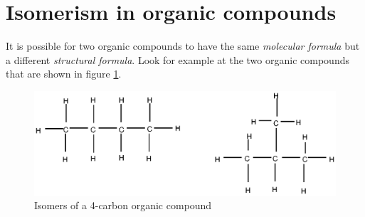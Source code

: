 



\section{Isomerism in organic compounds}
\label{sec:organic:isomer}

It is possible for two organic compounds to have the same \textit{molecular formula} but a different \textit{structural formula}. Look for example at the two organic compounds that are shown in figure \ref{fig:organic:butane}.

\begin{figure}[h]
\begin{center}
 \includegraphics{../../epsimages/isomer_butane.eps}
\end{center}


\caption{Isomers of a 4-carbon organic compound}
\label{fig:organic:butane}
\end{figure}


